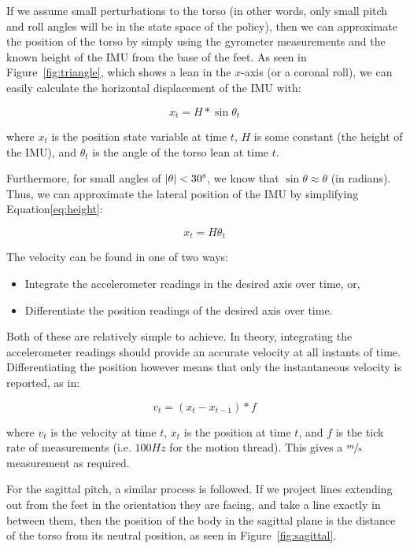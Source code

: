 If we assume small perturbations to the torso (in other words, only small pitch and roll angles will be in the state space of the policy), then we can approximate the position of the torso by simply using the gyrometer measurements and the known height of the IMU from the base of the feet. As seen in Figure~\ref{fig:triangle}, which shows a lean in the $x$-axis (or a coronal roll), we can easily calculate the horizontal displacement of the IMU with: 

\begin{equation} \label{eq:height}
x_t = H * \sin{\theta_t}
\end{equation}

where $x_t$ is the position state variable at time $t$, $H$ is some constant (the height of the IMU), and $\theta_t$ is the angle of the torso lean at time $t$.

Furthermore, for small angles of $|\theta| < 30\degree$, we know that $\sin{\theta} \approx \theta$ (in radians). Thus, we can approximate the lateral position of the IMU by simplifying Equation\ref{eq:height}:

\begin{equation} \label{eq:simplified}
x_t = H\theta_t
\end{equation}

The velocity can be found in one of two ways:
\begin{itemize}
\item Integrate the accelerometer readings in the desired axis over time, or,
\item Differentiate the position readings of the desired axis over time.
\end{itemize}

Both of these are relatively simple to achieve. In theory, integrating the accelerometer readings should provide an accurate velocity at all instants of time. Differentiating the position however means that only the instantaneous velocity is reported, as in:

\begin{equation}
v_t = (x_t - x_{t-1}) * f
\end{equation}

where $v_t$ is the velocity at time $t$, $x_t$ is the position at time $t$, and $f$ is the tick rate of measurements (i.e. $100Hz$ for the motion thread). This gives a $\sfrac{m}{s}$ measurement as required.

For the sagittal pitch, a similar process is followed. If we project lines extending out from the feet in the orientation they are facing, and take a line exactly in between them, then the position of the body in the sagittal plane is the distance of the torso from its neutral position, as seen in Figure~\ref{fig:sagittal}.

